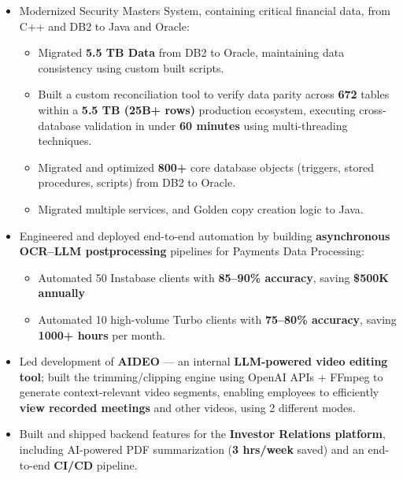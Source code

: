 \documentclass[a4paper,10pt]{article}
\newenvironment{zitemize}{
\begin{itemize}\itemsep0pt \parskip0pt \parsep1pt}
{\end{itemize}\vspace{-0.7cm}}
\begin{document}
\begin{zitemize}
\item Modernized Security Masters System, containing critical financial data, from C++ and DB2 to Java and Oracle: \vspace{-2pt}
\begin{itemize}
    \setlength{\itemsep}{-1pt}
    \setlength{\parsep}{0pt}
    \setlength{\topsep}{10pt}
    \setlength{\partopsep}{0pt}
    \item[-] Migrated  \textbf{5.5 TB Data} from DB2 to Oracle, maintaining data consistency using custom built scripts.
    \item[-] Built a custom reconciliation tool to verify data parity across \textbf{672} tables within a \textbf{5.5 TB (25B+ rows)} production ecosystem, executing cross-database validation in under \textbf{60 minutes}  using multi-threading techniques.
    \item[-] Migrated and optimized \textbf{800+} core database objects (triggers, stored procedures, scripts) from DB2 to Oracle.
    \item[-] Migrated multiple services, and Golden copy creation logic to Java.
\end{itemize}


\item Engineered and deployed end-to-end automation by building \textbf{asynchronous OCR--LLM postprocessing} pipelines for Payments Data Processing: \vspace{-0.15cm}
\begin{itemize}
    \item[-] Automated 50 Instabase clients with \textbf{85--90\% accuracy}, saving \textbf{\$500K annually}  \vspace{-0.15cm}
    \item[-] Automated 10 high-volume Turbo clients with \textbf{75--80\% accuracy}, saving \textbf{1000+ hours} per month. \vspace{-0.10cm}
\end{itemize}

\item Led development of \textbf{AIDEO} — an internal \textbf{LLM-powered video editing tool}; built the trimming/clipping engine using OpenAI APIs + FFmpeg to generate context-relevant video segments, enabling employees to efficiently \textbf{view recorded meetings} and other videos, using 2 different modes.

\item Built and shipped backend features for the \textbf{Investor Relations platform}, including AI-powered PDF summarization (\textbf{3 hrs/week} saved) and an end-to-end \textbf{CI/CD} pipeline.


\end{zitemize}
\end{document}
